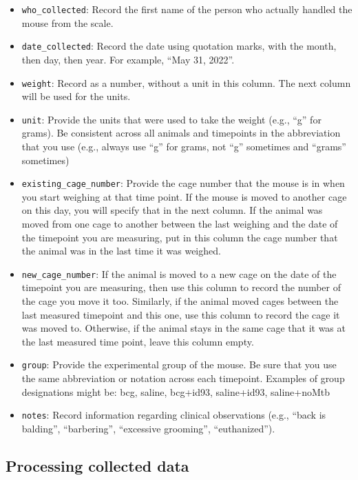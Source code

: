 \documentclass[
]{book}
\providecommand{\tightlist}{%
  \setlength{\itemsep}{0pt}\setlength{\parskip}{0pt}}
\begin{document}
\begin{itemize}
\tightlist
\item
  \texttt{who\_collected}: Record the first name of the person who actually handled the mouse from the scale.
\item
  \texttt{date\_collected}: Record the date using quotation marks, with the month, then day, then year. For example, ``May 31, 2022''.
\item
  \texttt{weight}: Record as a number, without a unit in this column. The next column will be used for the units.\\
\item
  \texttt{unit}: Provide the units that were used to take the weight (e.g., ``g'' for grams). Be consistent across all animals and timepoints in the abbreviation that you use (e.g., always use ``g'' for grams, not ``g'' sometimes and ``grams'' sometimes)
\item
  \texttt{existing\_cage\_number}: Provide the cage number that the mouse is in when you start weighing at that time point. If the mouse is moved to another cage on this day, you will specify that in the next column. If the animal was moved from one cage to another between the last weighing and the date of the timepoint you are measuring, put in this column the cage number that the animal was in the last time it was weighed.
\item
  \texttt{new\_cage\_number}: If the animal is moved to a new cage on the date of the timepoint you are measuring, then use this column to record the number of the cage you move it too. Similarly, if the animal moved cages between the last measured timepoint and this one, use this column to record the cage it was moved to. Otherwise, if the animal stays in the same cage that it was at the last measured time point, leave this column empty.
\item
  \texttt{group}: Provide the experimental group of the mouse. Be sure that you use the same abbreviation or notation across each timepoint. Examples of group designations might be: bcg, saline, bcg+id93, saline+id93, saline+noMtb
\item
  \texttt{notes}: Record information regarding clinical observations (e.g., ``back is balding'', ``barbering'', ``excessive grooming'', ``euthanized'').
\end{itemize}

\subsection{Processing collected data}\label{processing-collected-data}
\end{document}
